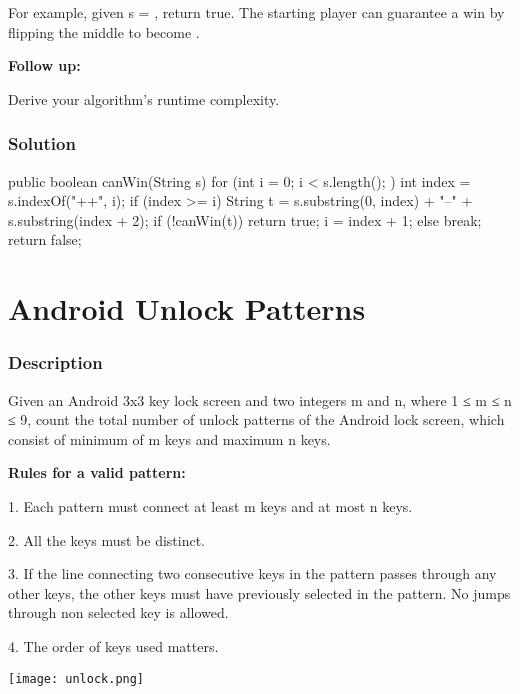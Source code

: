 For example, given s = , return true. The starting player can guarantee a win by flipping the middle  to become .

\textbf{Follow up:}

Derive your algorithm's runtime complexity.

\subsubsection{Solution}

\begin{Code}
public boolean canWin(String s) {
    for (int i = 0; i < s.length(); ) {
        int index = s.indexOf("++", i);
        if (index >= i) {
            String t = s.substring(0, index) + "--" + s.substring(index + 2);
            if (!canWin(t)) {
                return true;
            }
            i = index + 1;
        } else {
            break;
        }
    }
    return false;
}
\end{Code}

\newpage

\section{Android Unlock Patterns} %
\subsubsection{Description}

Given an Android 3x3 key lock screen and two integers m and n, where 1 ≤ m ≤ n ≤ 9, count the total number of unlock patterns of the Android lock screen, which consist of minimum of m keys and maximum n keys.

\textbf{Rules for a valid pattern:}

1. Each pattern must connect at least m keys and at most n keys.

2. All the keys must be distinct.

3. If the line connecting two consecutive keys in the pattern passes through any other keys, the other keys must have previously selected in the pattern. No jumps through non selected key is allowed.

4. The order of keys used matters.

\begin{center}
\texttt{[image: unlock.png]}\\
\end{center}

